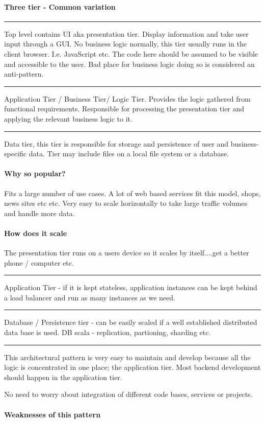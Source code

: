 \documentclass[a4paper, 11pt]{book}
\begin{document}
    \paragraph{Three tier - Common variation}
    \hrule
    Top level contains UI aka presentation tier.
    Display information and take user input through a GUI\@.
    No business logic normally, this tier usually runs in the client browser.
    I.e. JavaScript etc.
    The code here should be assumed to be visible and accessible to the user.
    Bad place for business logic doing so is considered an anti-pattern.
    \hrule
    Application Tier / Business Tier/ Logic Tier.
    Provides the logic gathered from functional requirements.
    Responsible for processing the presentation tier and applying the relevant business logic to it.
    \hrule
    Data tier, this tier is responsible for storage and persistence of user and business-specific data.
    Tier may include files on a local file system or a database.

    \paragraph{Why so popular?}
    Fits a large number of use cases.
    A lot of web based services fit this model, shops, news sites etc etc.
    Very easy to scale horizontally to take large traffic volumes and handle more data.

    \paragraph{How does it scale}
    The presentation tier runs on a users device so it scales by itself....get a better phone / computer etc.
    \hrule
    Application Tier - if it is kept stateless, application instances can be kept behind a load balancer and run as many instances as we need.
    \hrule
    Database / Persistence tier - can be easily scaled if a well established distributed data base is used. DB scala - replication, partioning, sharding etc.

    \hrule
    This architectural pattern is very easy to maintain and develop because all the logic is concentrated in one place; the application tier.
    Most backend development should happen in the application tier.

    No need to worry about integration of different code bases, services or projects.

    \paragraph{Weaknesses of this pattern}
\end{document}

